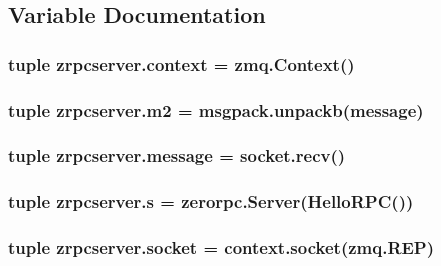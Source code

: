 \subsection{Variable Documentation}
\hypertarget{namespacezrpcserver_aba2558901917b86cf74044e3313df8d8}{
\subsubsection[{context}]{\setlength{\rightskip}{0pt plus 5cm}tuple zrpcserver.\+context = zmq.\+Context()}}\label{namespacezrpcserver_aba2558901917b86cf74044e3313df8d8}
\hypertarget{namespacezrpcserver_a867cc3b9e35ae551991976a86a47829d}{
\subsubsection[{m2}]{\setlength{\rightskip}{0pt plus 5cm}tuple zrpcserver.\+m2 = msgpack.\+unpackb({\bf message})}}\label{namespacezrpcserver_a867cc3b9e35ae551991976a86a47829d}
\hypertarget{namespacezrpcserver_a3cf2b2246b68a156037b2a86b71282ff}{
\subsubsection[{message}]{\setlength{\rightskip}{0pt plus 5cm}tuple zrpcserver.\+message = socket.\+recv()}}\label{namespacezrpcserver_a3cf2b2246b68a156037b2a86b71282ff}
\hypertarget{namespacezrpcserver_a27c4be0435b479044d8544312829e19f}{
\subsubsection[{s}]{\setlength{\rightskip}{0pt plus 5cm}tuple zrpcserver.\+s = zerorpc.\+Server({\bf Hello\+R\+P\+C}())}}\label{namespacezrpcserver_a27c4be0435b479044d8544312829e19f}
\hypertarget{namespacezrpcserver_a5e4952d9f1e8548ca60fc87e02414711}{
\subsubsection[{socket}]{\setlength{\rightskip}{0pt plus 5cm}tuple zrpcserver.\+socket = context.\+socket(zmq.\+R\+E\+P)}}\label{namespacezrpcserver_a5e4952d9f1e8548ca60fc87e02414711}

